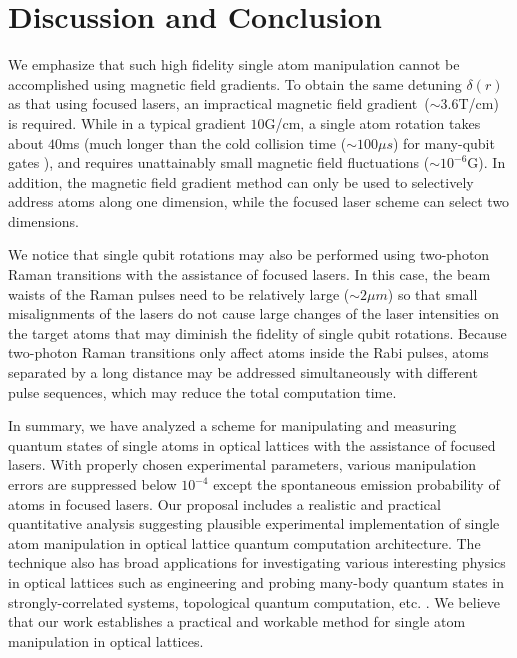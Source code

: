 \documentclass[pra,aps,showpacs,twocolumn]{revtex4}
\begin{document}
\section{Discussion and Conclusion}

We emphasize that such high fidelity single atom manipulation cannot be
accomplished using magnetic field gradients. To obtain the same detuning $%
\delta \left( r\right) $ as that using focused lasers, an impractical
magnetic field gradient\ ($\sim 3.6$T/cm) is required. While in a typical
gradient $10$G/cm, a single atom rotation takes about $40$ms (much longer
than the cold collision time ($\sim 100\mu s$) for many-qubit gates \cite%
{Jaksch,Mandel1}), and requires unattainably small magnetic field
fluctuations ($\sim 10^{-6}$G). In addition, the magnetic field gradient
method can only be used to selectively address atoms along one dimension,
while the focused laser scheme can select two dimensions.

We notice that single qubit rotations may also be performed using two-photon
Raman transitions \cite{Yavuz} with the assistance of focused lasers. In
this case, the beam waists of the Raman pulses need to be relatively large ($%
\sim 2\mu m$) so that small misalignments of the lasers do not cause large
changes of the laser intensities on the target atoms that may diminish the
fidelity of single qubit rotations. Because two-photon Raman transitions
only affect atoms inside the Rabi pulses, atoms separated by a long distance
may be addressed simultaneously with different pulse sequences, which may
reduce the total computation time.

In summary, we have analyzed a scheme for manipulating and measuring quantum
states of single atoms in optical lattices with the assistance of focused
lasers. With properly chosen experimental parameters, various manipulation
errors are suppressed below $10^{-4}$ except the spontaneous emission
probability of atoms in focused lasers. Our proposal includes a realistic
and practical quantitative analysis suggesting plausible experimental
implementation of single atom manipulation in optical lattice quantum
computation architecture. The technique also has broad applications for
investigating various interesting physics in optical lattices such as
engineering and probing many-body quantum states in strongly-correlated
systems, topological quantum computation, etc. \cite{Zhang}. We believe that
our work establishes a practical and workable method for single atom
manipulation in optical lattices.
\end{document}
